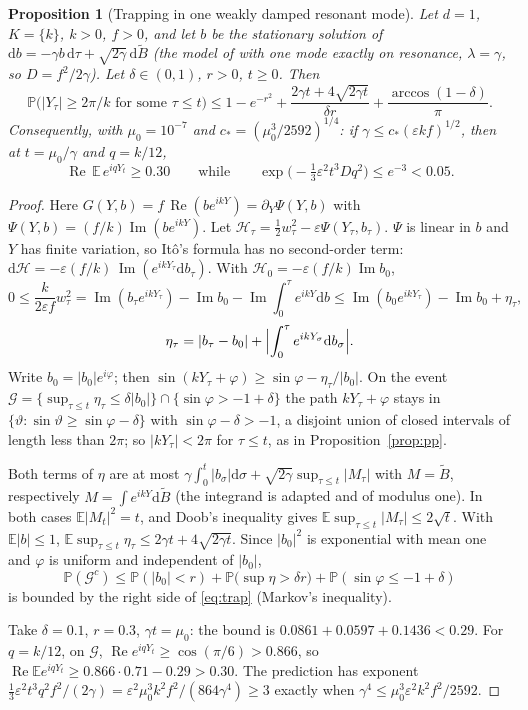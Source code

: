 \documentclass[11pt]{article}
\newcommand{\dd}{\mathrm{d}}
\newcommand{\E}{\mathbb{E}}
\newcommand{\PP}{\mathbb{P}}
\newcommand{\eps}{\varepsilon}
\renewcommand{\Re}{\operatorname{Re}}
\renewcommand{\Im}{\operatorname{Im}}
\newtheorem{proposition}[theorem]{Proposition}
\theoremstyle{remark}
\begin{document}
\begin{proposition}[Trapping in one weakly damped resonant mode]\label{prop:trap}
Let $d=1$, $K=\{k\}$, $k>0$, $f>0$, and let $b$ be the stationary solution of
$\dd b = -\gamma b\,\dd\tau+\sqrt{2\gamma}\,\dd\tilde B$ \textup{(}the model
of \cite{Note} with one mode exactly on resonance, $\lambda=\gamma$, so
$D = f^2/2\gamma$\textup{)}. Let $\delta\in(0,1)$, $r>0$, $t\ge0$. Then
\begin{equation}
  \PP\bigl(|Y_\tau|\ge2\pi/k\text{ for some }\tau\le t\bigr)
  \le1-e^{-r^2}+\frac{2\gamma t+4\sqrt{2\gamma t}}{\delta r}
   +\frac{\arccos(1-\delta)}{\pi} .
  \label{eq:trap}
\end{equation}
Consequently, with $\mu_0 = 10^{-7}$ and
$c_* = (\mu_0^3/2592)^{1/4}$: if $\gamma\le c_*(\eps kf)^{1/2}$, then at
$t = \mu_0/\gamma$ and $q = k/12$,
\[
  \Re\,\E\,e^{iqY_t}\ge0.30\qquad\text{while}\qquad
  \exp\bigl(-\tfrac13\eps^2t^3Dq^2\bigr)\le e^{-3}<0.05 .
\]
\end{proposition}

\begin{proof}
Here $G(Y,b) = f\,\Re(be^{ikY}) = \partial_Y\Psi(Y,b)$ with
$\Psi(Y,b) = (f/k)\Im(be^{ikY})$. Let $\mathcal{H}_\tau = \frac12w_\tau^2-\eps\Psi(Y_\tau,b_\tau)$.
$\Psi$ is linear in $b$ and $Y$ has finite variation, so It\^o's formula has
no second-order term:
$\dd\mathcal{H} = -\eps(f/k)\,\Im(e^{ikY_\tau}\dd b_\tau)$. With
$\mathcal{H}_0 = -\eps(f/k)\Im b_0$,
\[
  0\le\frac{k}{2\eps f}w_\tau^2
  = \Im(b_\tau e^{ikY_\tau})-\Im b_0-\Im\!\int_0^\tau e^{ikY}\dd b
  \le\Im(b_0e^{ikY_\tau})-\Im b_0+\eta_\tau,
\]
\[
  \eta_\tau = |b_\tau-b_0|+\Bigl|\int_0^\tau e^{ikY_\sigma}\dd b_\sigma\Bigr| .
\]
Write $b_0 = |b_0|e^{i\varphi}$; then
$\sin(kY_\tau+\varphi)\ge\sin\varphi-\eta_\tau/|b_0|$. On the event
$\mathcal{G} = \{\sup_{\tau\le t}\eta_\tau\le\delta|b_0|\}\cap\{\sin\varphi>-1+\delta\}$
the path $kY_\tau+\varphi$ stays in
$\{\vartheta:\sin\vartheta\ge\sin\varphi-\delta\}$ with
$\sin\varphi-\delta>-1$, a disjoint union of closed intervals of length less
than $2\pi$; so $|kY_\tau|<2\pi$ for $\tau\le t$, as in
Proposition~\ref{prop:pp}.

Both terms of $\eta$ are at most
$\gamma\int_0^t|b_\sigma|\dd\sigma+\sqrt{2\gamma}\sup_{\tau\le t}|M_\tau|$
with $M = \tilde B$, respectively $M = \int e^{ikY}\dd\tilde B$ (the integrand
is adapted and of modulus one). In both cases $\E|M_t|^2 = t$, and Doob's
inequality gives $\E\sup_{\tau\le t}|M_\tau|\le2\sqrt t$. With
$\E|b|\le1$, $\E\sup_{\tau\le t}\eta_\tau\le2\gamma t+4\sqrt{2\gamma t}$.
Since $|b_0|^2$ is exponential with mean one and $\varphi$ is uniform and
independent of $|b_0|$,
\[
  \PP(\mathcal{G}^c)\le\PP(|b_0|<r)
   +\PP\bigl(\sup\eta>\delta r\bigr)+\PP(\sin\varphi\le-1+\delta)
\]
is bounded by the right side of \eqref{eq:trap} (Markov's inequality).

Take $\delta = 0.1$, $r = 0.3$, $\gamma t = \mu_0$: the bound is
$0.0861+0.0597+0.1436<0.29$. For $q = k/12$, on $\mathcal{G}$,
$\Re e^{iqY_t}\ge\cos(\pi/6)>0.866$, so
$\Re\E e^{iqY_t}\ge0.866\cdot0.71-0.29>0.30$. The prediction has exponent
$\frac13\eps^2t^3q^2f^2/(2\gamma) = \eps^2\mu_0^3k^2f^2/(864\gamma^4)\ge3$ exactly
when $\gamma^4\le\mu_0^3\eps^2k^2f^2/2592$.
\end{proof}
\end{document}
